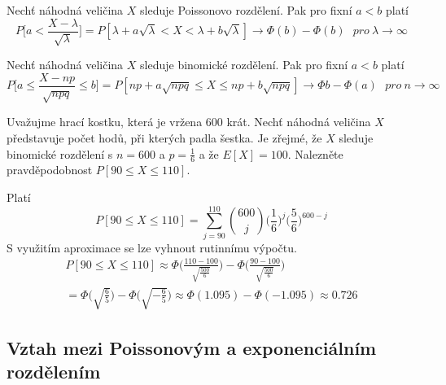 \begin{theorem}
Nechť náhodná veličina $X$ sleduje Poissonovo rozdělení. Pak pro fixní $a < b$ platí
\begin{equation*}
P\Big[a < \frac{X - \lambda}{\sqrt{\lambda}}\Big] = P[\lambda + a\sqrt{\lambda} < X < \lambda + b\sqrt{\lambda}] \rightarrow \Phi(b) - \Phi(b) ~~~\textit{pro}~ \lambda \rightarrow \infty
\end{equation*}
\end{theorem}

\begin{theorem}
Nechť náhodná veličina $X$ sleduje binomické rozdělení. Pak pro fixní $a < b$ platí
\begin{equation*}
P\Big[a \le \frac{X - np}{\sqrt{npq}} \le b \Big] = P[np + a \sqrt{npq} \le X \le np + b \sqrt{npq}] \rightarrow \Phi{b} - \Phi(a) ~~~\textit{pro}~ n \rightarrow \infty
\end{equation*}
\end{theorem}

\begin{example}
Uvažujme hrací kostku, která je vržena 600 krát. Nechť náhodná veličina $X$ představuje počet hodů, při kterých padla šestka. Je zřejmé, že $X$ sleduje binomické rozdělení s $n = 600$ a $p = \frac{1}{6}$ a že $E[X] = 100$. Nalezněte pravděpodobnost $P[90 \le X \le 110]$.

Platí
\begin{equation*}
P[90 \le X \le 110] = \sum_{j = 90}^{110}\binom{600}{j}\Big(\frac{1}{6}\Big)^j \Big(\frac{5}{6}\Big)^{600 - j}
\end{equation*}
S využitím aproximace se lze vyhnout rutinnímu výpočtu.
\begin{gather*}
P[90 \le X \le 110] \approx \Phi\Big(\frac{110 - 100}{\sqrt{\frac{500}{6}}}\Big) - \Phi\Big(\frac{90 - 100}{\sqrt{\frac{500}{6}}}\Big)\\
=\Phi \Big(\sqrt{\frac{6}{5}}\Big) - \Phi \Big(\sqrt{-\frac{6}{5}}\Big) \approx \Phi(1.095) - \Phi(-1.095) \approx 0.726
\end{gather*}
\end{example}

\subsection{Vztah mezi Poissonovým a exponenciálním rozdělením}

